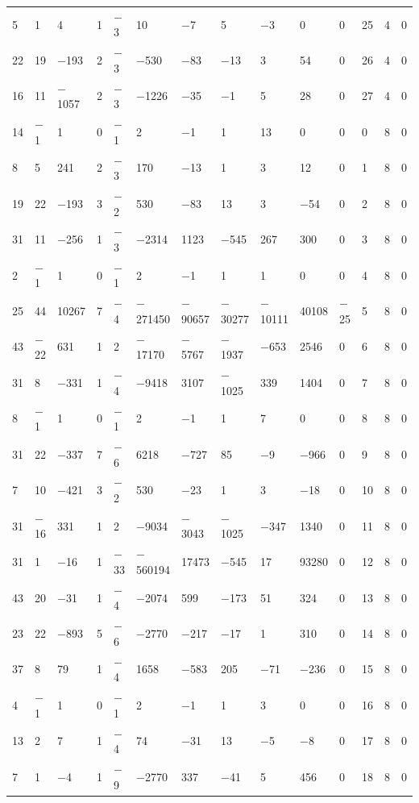 \documentclass[10pt,a4paper]{amsart}
\numberwithin{equation}{section}
\theoremstyle{definition}
\numberwithin{table}{section}
\begin{document}
{\begin{paracol}{3}
\begin{supertabular}{|w{c}{.32cm}w{c}{.32cm}w{c}{.32cm}@{\hspace{.5cm}}w{c}{.2cm}w{c}{.2cm}|@{\hspace{\tabcolsep}}HHHHHHw{c}{.17cm}w{c}{.17cm}w{c}{.17cm}|}
			5 & 1 & 4 & 1 & $-$3 & 10 & $-$7 & 5 & $-$3 & 0 & 0 & 25 & 4 & 0 \\
			22 & 19 & $-$193 & 2 & $-$3 & $-$530 & $-$83 & $-$13 & 3 & 54 & 0 & 26 & 4 & 0 \\
			16 & 11 & $-$1057 & 2 & $-$3 & $-$1226 & $-$35 & $-$1 & 5 & 28 & 0 & 27 & 4 & 0 \\
			14 & $-$1 & 1 & 0 & $-$1 & 2 & $-$1 & 1 & 13 & 0 & 0 & 0 & 8 & 0 \\
			8 & 5 & 241 & 2 & $-$3 & 170 & $-$13 & 1 & 3 & 12 & 0 & 1 & 8 & 0 \\
			19 & 22 & $-$193 & 3 & $-$2 & 530 & $-$83 & 13 & 3 & $-$54 & 0 & 2 & 8 & 0 \\
			31 & 11 & $-$256 & 1 & $-$3 & $-$2314 & 1123 & $-$545 & 267 & 300 & 0 & 3 & 8 & 0 \\
			2 & $-$1 & 1 & 0 & $-$1 & 2 & $-$1 & 1 & 1 & 0 & 0 & 4 & 8 & 0 \\
			25 & 44 & 10267 & 7 & $-$4 & $-$271450 & $-$90657 & $-$30277 & $-$10111 & 40108 & $-$25 & 5 & 8 & 0 \\
			43 & $-$22 & 631 & 1 & 2 & $-$17170 & $-$5767 & $-$1937 & $-$653 & 2546 & 0 & 6 & 8 & 0 \\
			31 & 8 & $-$331 & 1 & $-$4 & $-$9418 & 3107 & $-$1025 & 339 & 1404 & 0 & 7 & 8 & 0 \\
			8 & $-$1 & 1 & 0 & $-$1 & 2 & $-$1 & 1 & 7 & 0 & 0 & 8 & 8 & 0 \\
			31 & 22 & $-$337 & 7 & $-$6 & 6218 & $-$727 & 85 & $-$9 & $-$966 & 0 & 9 & 8 & 0 \\
			7 & 10 & $-$421 & 3 & $-$2 & 530 & $-$23 & 1 & 3 & $-$18 & 0 & 10 & 8 & 0 \\
			31 & $-$16 & 331 & 1 & 2 & $-$9034 & $-$3043 & $-$1025 & $-$347 & 1340 & 0 & 11 & 8 & 0 \\
			31 & 1 & $-$16 & 1 & $-$33 & $-$560194 & 17473 & $-$545 & 17 & 93280 & 0 & 12 & 8 & 0 \\
			43 & 20 & $-$31 & 1 & $-$4 & $-$2074 & 599 & $-$173 & 51 & 324 & 0 & 13 & 8 & 0 \\
			23 & 22 & $-$893 & 5 & $-$6 & $-$2770 & $-$217 & $-$17 & 1 & 310 & 0 & 14 & 8 & 0 \\
			37 & 8 & 79 & 1 & $-$4 & 1658 & $-$583 & 205 & $-$71 & $-$236 & 0 & 15 & 8 & 0 \\
			4 & $-$1 & 1 & 0 & $-$1 & 2 & $-$1 & 1 & 3 & 0 & 0 & 16 & 8 & 0 \\
			13 & 2 & 7 & 1 & $-$4 & 74 & $-$31 & 13 & $-$5 & $-$8 & 0 & 17 & 8 & 0 \\
			7 & 1 & $-$4 & 1 & $-$9 & $-$2770 & 337 & $-$41 & 5 & 456 & 0 & 18 & 8 & 0 \\

\end{supertabular}
\end{paracol}}
\end{document}
